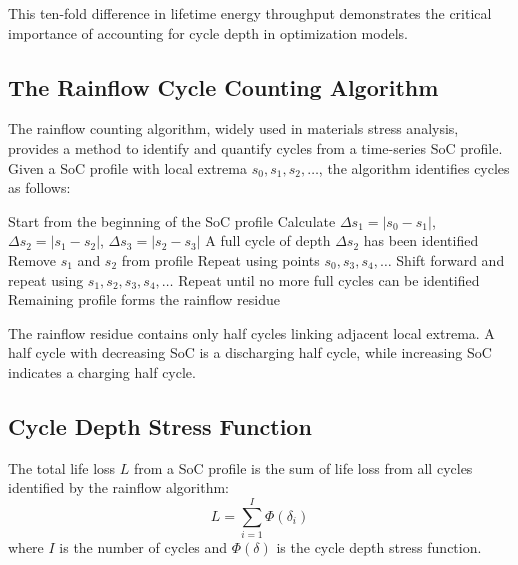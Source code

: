 \documentclass[10pt,twocolumn]{article}
\begin{document}
This ten-fold difference in lifetime energy throughput demonstrates the critical importance of accounting for cycle depth in optimization models.

\subsection{The Rainflow Cycle Counting Algorithm}

The rainflow counting algorithm, widely used in materials stress analysis, provides a method to identify and quantify cycles from a time-series SoC profile. Given a SoC profile with local extrema $s_0, s_1, s_2, \ldots$, the algorithm identifies cycles as follows:

    \begin{algorithm}[htb]
    \caption{Rainflow Cycle Counting}
    \begin{algorithmic}[1]
    \setlength\itemsep{0pt}
    \State Start from the beginning of the SoC profile
    \State Calculate $\Delta s_1 = |s_0 - s_1|$, $\Delta s_2 = |s_1 - s_2|$, $\Delta s_3 = |s_2 - s_3|$
    \State A full cycle of depth $\Delta s_2$ has been identified
    \State Remove $s_1$ and $s_2$ from profile
    \State Repeat using points $s_0, s_3, s_4, \ldots$
    \Else
    \State Shift forward and repeat using $s_1, s_2, s_3, s_4, \ldots$
    \EndIf
    \State Repeat until no more full cycles can be identified
    \State Remaining profile forms the rainflow residue
    \end{algorithmic}
    \end{algorithm}

The rainflow residue contains only half cycles linking adjacent local extrema. A half cycle with decreasing SoC is a discharging half cycle, while increasing SoC indicates a charging half cycle.

\subsection{Cycle Depth Stress Function}

The total life loss $L$ from a SoC profile is the sum of life loss from all cycles identified by the rainflow algorithm:
\begin{equation}
L = \sum_{i=1}^{I} \Phi(\delta_i)
\label{eq:total_life_loss}
\end{equation}
where $I$ is the number of cycles and $\Phi(\delta)$ is the cycle depth stress function.
\end{document}

